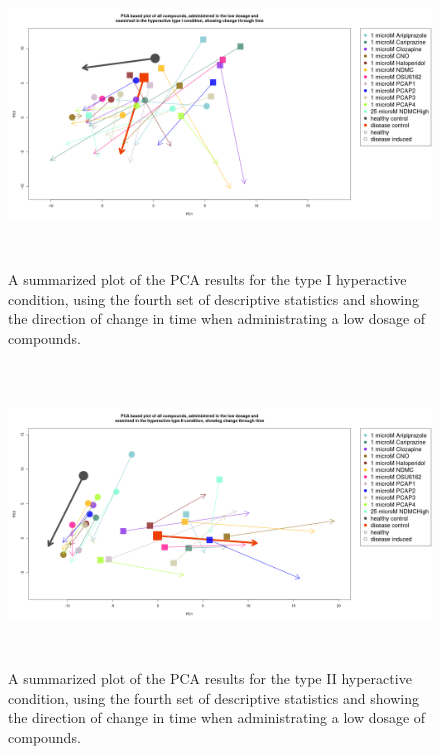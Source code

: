 \documentclass[a4paper,12pt]{article}
\begin{document}
\newpage
\begin{figure}[h!]
\begin{center}
\includegraphics[width=16cm,height=8cm]{All_together_1_microM_DarkApoHigh_in_time_set4.png}
\caption{A summarized plot of the PCA results for the type I hyperactive condition, using the fourth set of descriptive statistics and showing the direction of change in time when administrating a low dosage of compounds.}
\end{center}
\end{figure}
\newpage
\begin{figure}[h!]
\begin{center}
\includegraphics[width=16cm,height=8cm]{All_together_1_microM_DarkPTZ_in_time_set4.png}
\caption{A summarized plot of the PCA results for the type II hyperactive condition, using the fourth set of descriptive statistics and showing the direction of change in time when administrating a low dosage of compounds.}
\end{center}
\end{figure}
\end{document}
